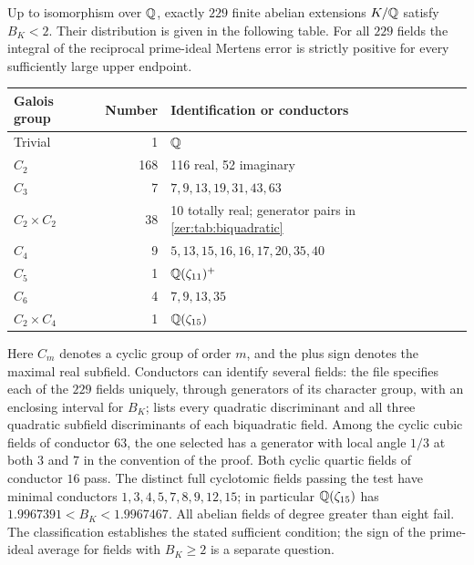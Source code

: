 \begin{theorem}[\stG]\label{zer:thm:zhao}
Up to isomorphism over $\mathbb{Q}$, exactly $229$ finite abelian extensions $K/\mathbb{Q}$ satisfy
$B_K<2$. Their distribution is given in the following table. For all $229$ fields the
integral of the reciprocal prime-ideal Mertens error is strictly positive for every
sufficiently large upper endpoint.
\end{theorem}
\begin{center}\small\begin{tabular}{@{}lrl@{}}\toprule
Galois group & Number & Identification or conductors\\\midrule
Trivial & 1 & $\mathbb{Q}$\\
$C_2$ & 168 & 116 real, 52 imaginary\\
$C_3$ & 7 & $7,9,13,19,31,43,63$\\
$C_2\times C_2$ & 38 & 10 totally real; generator pairs in \cref{zer:tab:biquadratic}\\
$C_4$ & 9 & $5,13,15,16,16,17,20,35,40$\\
$C_5$ & 1 & $\mathbb{Q}(\zeta_{11})^+$\\
$C_6$ & 4 & $7,9,13,35$\\
$C_2\times C_4$ & 1 & $\mathbb{Q}(\zeta_{15})$\\\bottomrule
\end{tabular}\end{center}
Here $C_m$ denotes a cyclic group of order $m$, and the plus sign denotes the maximal real
subfield. Conductors can identify several fields: the file
 specifies each of the $229$ fields
uniquely, through generators of its character group, with an enclosing interval for $B_K$;
 lists every quadratic discriminant and all three
quadratic subfield discriminants of each biquadratic field. Among the cyclic cubic fields
of conductor $63$, the one selected has a generator with local angle $1/3$ at both $3$ and
$7$ in the convention of the proof. Both cyclic quartic fields of conductor $16$ pass. The
distinct full cyclotomic fields passing the test have minimal conductors
$1,3,4,5,7,8,9,12,15$; in particular $\mathbb{Q}(\zeta_{15})$ has $1.9967391<B_K<1.9967467$. All
abelian fields of degree greater than eight fail. The classification establishes the stated
sufficient condition; the sign of the prime-ideal average for fields with $B_K\ge2$ is a
separate question.


